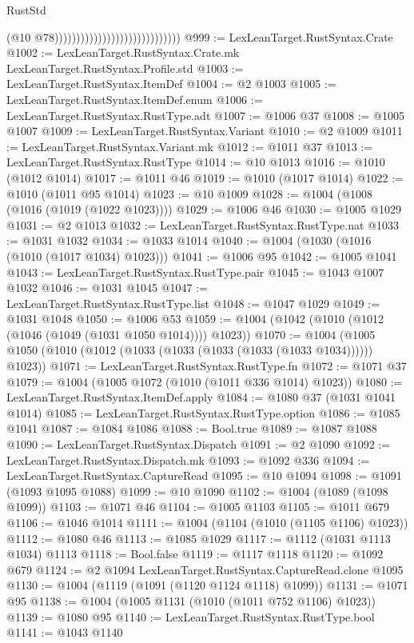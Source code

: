 \begin{lexlean}{RustStd}
\begin{coremodule}
{\begin{coremodule}
{{{{{{{{{{{{{{{{{{{{{{{{{{{{{{{{                                                            (@10 @78)))))))))))))))))))))))))))))
@999 := LexLeanTarget.RustSyntax.Crate
@1002 := LexLeanTarget.RustSyntax.Crate.mk LexLeanTarget.RustSyntax.Profile.std
@1003 := LexLeanTarget.RustSyntax.ItemDef
@1004 := @2 @1003
@1005 := LexLeanTarget.RustSyntax.ItemDef.enum
@1006 := LexLeanTarget.RustSyntax.RustType.adt
@1007 := @1006 @37
@1008 := @1005 @1007
@1009 := LexLeanTarget.RustSyntax.Variant
@1010 := @2 @1009
@1011 := LexLeanTarget.RustSyntax.Variant.mk
@1012 := @1011 @37
@1013 := LexLeanTarget.RustSyntax.RustType
@1014 := @10 @1013
@1016 := @1010 (@1012 @1014)
@1017 := @1011 @46
@1019 := @1010 (@1017 @1014)
@1022 := @1010 (@1011 @95 @1014)
@1023 := @10 @1009
@1028 := @1004 (@1008 (@1016 (@1019 (@1022 @1023))))
@1029 := @1006 @46
@1030 := @1005 @1029
@1031 := @2 @1013
@1032 := LexLeanTarget.RustSyntax.RustType.nat
@1033 := @1031 @1032
@1034 := @1033 @1014
@1040 := @1004 (@1030 (@1016 (@1010 (@1017 @1034) @1023)))
@1041 := @1006 @95
@1042 := @1005 @1041
@1043 := LexLeanTarget.RustSyntax.RustType.pair
@1045 := @1043 @1007 @1032
@1046 := @1031 @1045
@1047 := LexLeanTarget.RustSyntax.RustType.list
@1048 := @1047 @1029
@1049 := @1031 @1048
@1050 := @1006 @53
@1059 := @1004 (@1042 (@1010 (@1012 (@1046 (@1049 (@1031 @1050 @1014)))) @1023))
@1070 := @1004 (@1005 @1050 (@1010 (@1012 (@1033 (@1033 (@1033 (@1033 (@1033 @1034)))))) @1023))
@1071 := LexLeanTarget.RustSyntax.RustType.fn
@1072 := @1071 @37
@1079 := @1004 (@1005 @1072 (@1010 (@1011 @336 @1014) @1023))
@1080 := LexLeanTarget.RustSyntax.ItemDef.apply
@1084 := @1080 @37 (@1031 @1041 @1014)
@1085 := LexLeanTarget.RustSyntax.RustType.option
@1086 := @1085 @1041
@1087 := @1084 @1086
@1088 := Bool.true
@1089 := @1087 @1088
@1090 := LexLeanTarget.RustSyntax.Dispatch
@1091 := @2 @1090
@1092 := LexLeanTarget.RustSyntax.Dispatch.mk
@1093 := @1092 @336
@1094 := LexLeanTarget.RustSyntax.CaptureRead
@1095 := @10 @1094
@1098 := @1091 (@1093 @1095 @1088)
@1099 := @10 @1090
@1102 := @1004 (@1089 (@1098 @1099))
@1103 := @1071 @46
@1104 := @1005 @1103
@1105 := @1011 @679
@1106 := @1046 @1014
@1111 := @1004 (@1104 (@1010 (@1105 @1106) @1023))
@1112 := @1080 @46
@1113 := @1085 @1029
@1117 := @1112 (@1031 @1113 @1034) @1113
@1118 := Bool.false
@1119 := @1117 @1118
@1120 := @1092 @679
@1124 := @2 @1094 LexLeanTarget.RustSyntax.CaptureRead.clone @1095
@1130 := @1004 (@1119 (@1091 (@1120 @1124 @1118) @1099))
@1131 := @1071 @95
@1138 := @1004 (@1005 @1131 (@1010 (@1011 @752 @1106) @1023))
@1139 := @1080 @95
@1140 := LexLeanTarget.RustSyntax.RustType.bool
@1141 := @1043 @1140
}}}}}}}}}}}}}}}}}}}}}}}}}}}}}}}}
\end{coremodule}}
\end{coremodule}
\end{lexlean}
